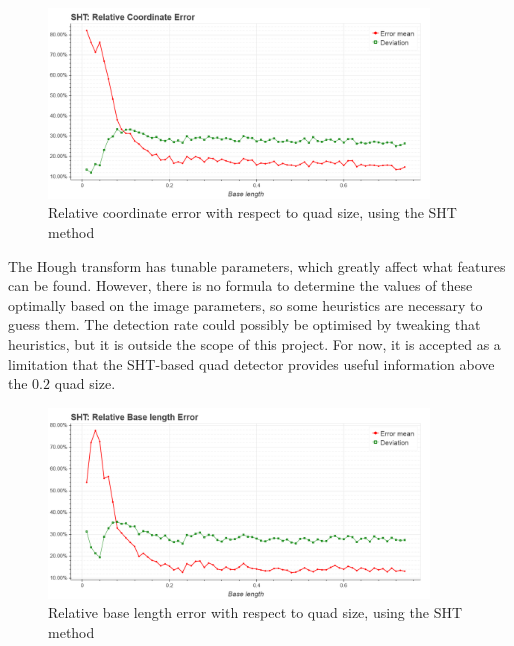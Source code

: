 \begin{figure}[ht]
	\centering
	\includegraphics[width=0.9\textwidth]{figures/plots/sht_relative_coordinate_error.png}
	\caption{Relative coordinate error with respect to quad size, using the SHT method}
	\label{fig:shtRelCoordErr}
\end{figure}
The Hough transform has tunable parameters, which greatly affect what features can be found.
However, there is no formula to determine the values of these optimally based on the image parameters, so some heuristics are necessary to guess them.
The detection rate could possibly be optimised by tweaking that heuristics, but it is outside the scope of this project.
For now, it is accepted as a limitation that the SHT-based quad detector provides useful information above the $0.2$ quad size.
\begin{figure}[ht]
	\centering
	\includegraphics[width=0.9\textwidth]{figures/plots/sht_relative_base_length_error.png}
	\caption{Relative base length error with respect to quad size, using the SHT method}
	\label{fig:shtRelBaseErr}
\end{figure}

